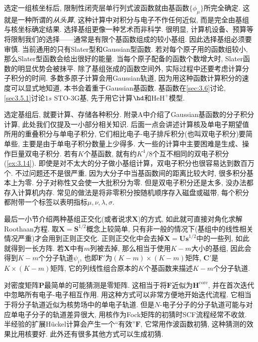 选定一组核坐标后, 
限制性闭壳层单行列式波函数就由基函数$\{\phi_\mu\}$所完全确定. 
这就是一种所谓的\emph{从头算}, 
这种计算中对积分与电子\ha 不作任何近似, 
而是完全由基组与核坐标确定结果. 
选择基组更像一种艺术而非科学. 
很明显, 
计算机设备、预算等将限制我们的选择——通常是有限个基函数组成的较小基组. 
因此选择基组必须要审慎. 
当前通用的只有Slater型和Gaussian型函数. 
若对每个原子用的函数组较小, 
那么Slater型函数会给出很好的能量. 
当每个原子配备的函数个数增大时, 
Slater函数的明显优势会被抹平. 
除了基组张成的函数空间外, 
实际过程中还要考虑计算分子积分的时间. 
多数多原子计算会用Gaussian轨道, 
因为用这种函数计算积分的速度可以显式地知道, 
本书会着重于Gaussian基函数. 
基函数在\autoref{sec:3.6}讨论, 
\autoref{sec3.5.1}讨论$1s$ STO-3G基, 
先于用它计算$\hd$和$\mathrm{HeH}^+$模型.


选定基组后, 
就要计算、存储各种积分. 
附录A中介绍了Gaussian基函数的分子积分计算, 
此处我们仅提及一小部分相关知识. 
后面一点会讲述计算核\ha 及单电子期望值所用的重叠积分与单电子积分, 
它们相比电子-电子排斥积分(也叫双电子积分)要简单些, 
主要是由于单电子积分数量上少得多. 
大一些的计算中主要困难是生成、操作巨量双电子积分. 
若有$K$个基函数, 
就有约$K^4/8$个互不相同的双电子积分(\autoref{ex:3.14}). 
即使是对不太大的分子做小基组计算，双电子积分也很容易达到数百万个. 
不过问题还不是很严重, 
因为大分子中当基函数间的距离比较大时, 
很多积分基本上为零. 
分子对称性又会使一大批积分为零. 
但是双电子积分还是太多, 
没办法都存入计算机内存. 
常见的做法是将非零积分按随机顺序存入磁盘或磁带, 
每个积分都附带一个标签以表明指标$\mu,\nu,\lambda,\sigma$.


最后一小节介绍两种基组正交化(或者说求$\mathbf{X}$)的方式, 
如此就可直接对角化求解Roothaan方程. 
取$\mathbf{X=S}^{1/2}$概念上较简单, 
只有非一般的情况下(基组中的线性相关情况严重)才会用到正则正交化. 
正则正交化中会去掉$\mathbf{X=Us}^{1/2}$中的一些列, 
如此就得到一长方阵. 
若$\mathbf{X}$中有$m$列被去掉, 
那么相当于使用$K-m$大小的基组, 
因此会得到$K-m$个分子轨道$\psi_i$, 
也即$\mathbf{F'}$为$(K-m)\times(K-m)$矩阵, 
$\mathbf{C'}$是$K\times(K-m)$矩阵, 
它的列线性组合原本的$K$个基函数来描述$K-m$个分子轨道.


对密度矩阵$\mathbf{P}$最简单的可能猜测是零矩阵. 
这相当于将$\mathbf{F}$近似为$\mathbf{H}^\mathrm{core}$, 
并在首次迭代中忽略所有电子-电子相互作用. 
用这种方式可以非常方便地开始迭代流程. 
它相当于将分子轨道近似为核势场中的单电子轨道. 
但是$N$-电子分子的分子轨道可能与对应单电子分子的轨道差异很大, 
用核\ha 作为Fock矩阵的初猜时SCF流程经常不收敛. 
半经验的扩展H\"uckel计算会产生一个``有效''$\mathbf{F}$, 
它常用作波函数初猜, 
这种猜测的效果比用核\ha 要好. 
此外还有很多其他方式可以生成初猜.


